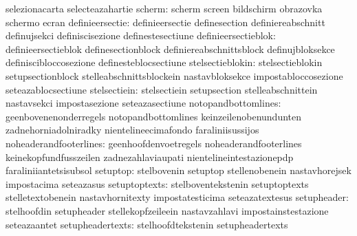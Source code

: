                                   selezionacarta                   selecteazahartie
                          scherm: scherm                           screen
                                  bildschirm                       obrazovka
                                  schermo                          ecran
                 definieersectie: definieersectie                  definesection
                                  definiereabschnitt               definujsekci
                                  definiscisezione                 definestesectiune
             definieersectieblok: definieersectieblok              definesectionblock
                                  definiereabschnittsblock         definujbloksekce
                                  definiscibloccosezione           definesteblocsectiune
                stelsectieblokin: stelsectieblokin                 setupsectionblock
                                  stelleabschnittsblockein         nastavbloksekce
                                  impostabloccosezione             seteazablocsectiune
                    stelsectiein: stelsectiein                     setupsection
                                  stelleabschnittein               nastavsekci
                                  impostasezione                   seteazasectiune
             notopandbottomlines: geenbovenenonderregels           notopandbottomlines
                                  keinzeilenobenundunten           zadnehorniadolniradky
                                  nientelineecimafondo             faraliniisussijos
          noheaderandfooterlines: geenhoofdenvoetregels            noheaderandfooterlines
                                  keinekopfundfusszeilen           zadnezahlaviaupati
                                  nientelineintestazionepdp        faraliniiantetsisubsol
                        setuptop: stelbovenin                      setuptop
                                  stellenobenein                   nastavhorejsek
                                  impostacima                      seteazasus
                   setuptoptexts: stelboventekstenin               setuptoptexts
                                  stelletextobenein                nastavhornitexty
                                  impostatesticima                 seteazatextesus
                     setupheader: stelhoofdin                      setupheader
                                  stellekopfzeileein               nastavzahlavi
                                  impostainstestazione             seteazaantet
                setupheadertexts: stelhoofdtekstenin               setupheadertexts
